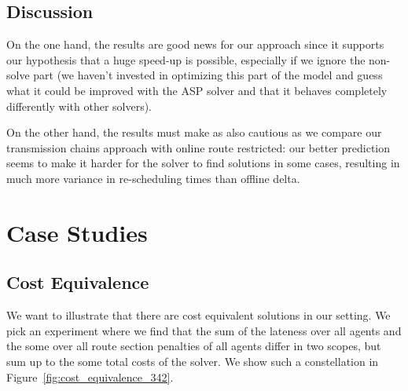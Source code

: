 \documentclass{article}
\begin{document}
\subsection{Discussion}\label{subsec:results_discussion}

On the one hand, the results are good news for our approach since it supports our hypothesis that a huge speed-up is possible, especially if we ignore the non-solve part (we haven't invested in optimizing this part of the model and guess what it could be improved with the ASP solver and that it behaves completely differently with other solvers).

On the other hand, the results must make as also cautious as we compare our  transmission chains approach with online route restricted: our better prediction seems to make it harder for the solver to find solutions in some cases, resulting in much more variance in re-scheduling times than offline delta.

\section{Case Studies}\label{sec:CaseStudies}



\subsection{Cost Equivalence}\label{subsec:cost_equivalence}


We want to illustrate that there are cost equivalent solutions in our setting.
We pick an experiment where we find that the sum of the lateness over all agents and the some over all route section penalties of all agents differ in two scopes, but sum up to the some total costs of the solver. We show such a constellation in Figure~\ref{fig:cost_equivalence_342}.
\end{document}
